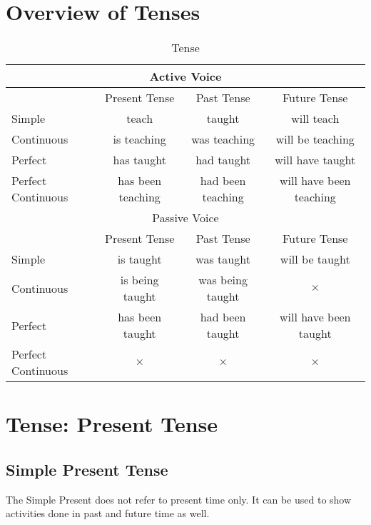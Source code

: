 \onecolumn
\section{Overview of Tenses}
\begin{table}[h]
    \centering
    \begin{tabular}{|l|c|c|c|}
        \hline
        \multicolumn{4}{|c|}{Active Voice} \\ \hline
        & Present Tense & Past Tense & Future Tense \\ \hline
        Simple & teach & taught & will teach \\ \hline
        Continuous & is teaching & was teaching & will be teaching \\ \hline
        Perfect & has taught & had taught & will have taught \\ \hline
        Perfect Continuous & has been teaching & had been teaching & will have been teaching \\ \hline \hline
        \multicolumn{4}{|c|}{Passive Voice} \\ \hline
        & Present Tense & Past Tense & Future Tense \\ \hline
        Simple & is taught & was taught & will be taught \\ \hline
        Continuous & is being taught & was being taught & $\times$ \\ \hline
        Perfect & has been taught & had been taught & will have been taught \\ \hline
        Perfect Continuous & $\times$ & $\times$ & $\times$ \\ \hline
    \end{tabular}
    \caption{Tense}
\end{table}

\section{Tense: Present Tense}
\subsection{Simple Present Tense}
The Simple Present does not refer to present time only.
It can be used to show activities done in past and future time as well.

